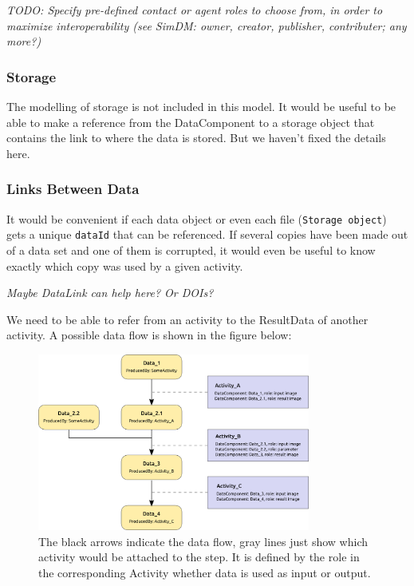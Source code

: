 \documentclass[11pt,a4paper]{ivoa}
\begin{document}
\emph{TODO: Specify pre-defined contact or agent roles to choose from, in order to maximize interoperability (see SimDM: owner, creator, publisher, contributer; any more?)}


\subsubsection{Storage}
The modelling of storage is not included in this model. 
It would be useful to be able to make a reference from the DataComponent to a storage
object that contains the link to where the data is stored. But we haven't fixed the 
details here.


\subsubsection{Links Between Data}\label{sec:links_between_data}
It would be convenient if each data object or even each file (\texttt{Storage object})
gets a unique \texttt{dataId} that can be referenced. If several copies have been
made out of a data set and one of them is corrupted, it would even be useful to know
exactly which copy was used by a given activity. 

\emph{Maybe DataLink can help here? Or DOIs?}

We need to be able to refer from an activity to the ResultData of another
activity. A possible data flow is shown in the figure below:

\begin{figure}
\centering
\includegraphics[width=0.8\textwidth]{ProvDM-activities.png}
\caption{The black arrows indicate the
data flow, gray lines just show which activity would be attached to the step. It
is defined by the role in the corresponding Activity whether data is used as input
or output.}
\label{fig:activities}
\end{figure}
\end{document}
